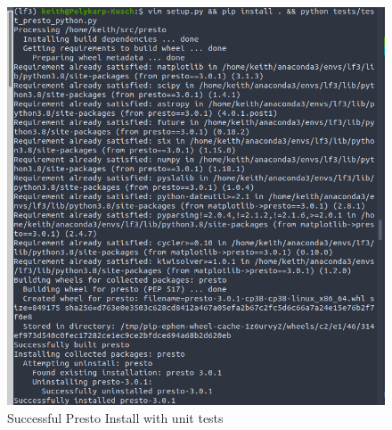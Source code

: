 \documentclass{article}
\begin{document}
\begin{figure}
	\includegraphics[width=\linewidth]{Images/PRESTO3_install.png}
	\caption{Successful Presto Install with unit tests}
	\label{fig:Presto-Install}  			
\end{figure}
\end{document}
